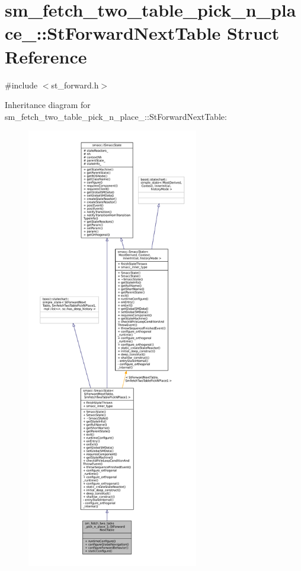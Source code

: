 \hypertarget{structsm__fetch__two__table__pick__n__place__1_1_1StForwardNextTable}{}\section{sm\+\_\+fetch\+\_\+two\+\_\+table\+\_\+pick\+\_\+n\+\_\+place\+\_\+:\+:St\+Forward\+Next\+Table Struct Reference}
\label{structsm__fetch__two__table__pick__n__place__1_1_1StForwardNextTable}


{\ttfamily \#include $<$st\+\_\+forward.\+h$>$}



Inheritance diagram for sm\+\_\+fetch\+\_\+two\+\_\+table\+\_\+pick\+\_\+n\+\_\+place\+\_\+:\+:St\+Forward\+Next\+Table\+:
\nopagebreak
\begin{figure}[H]
\begin{center}
\leavevmode
\includegraphics[height=550pt]{structsm__fetch__two__table__pick__n__place__1_1_1StForwardNextTable__inherit__graph}
\end{center}
\end{figure}


